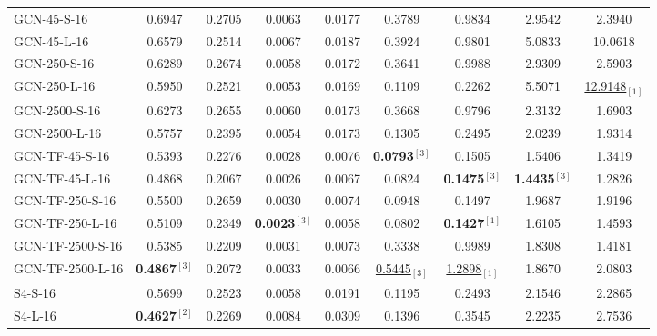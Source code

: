 \begin{table*}[h]
{\begin{tabular}{lcc|cc|cc|cc}
            \midrule
            GCN-45-S-16 
                & 0.6947 & 0.2705
                & 0.0063 & 0.0177 & 0.3789 & 0.9834 & 2.9542 & 2.3940\\
            GCN-45-L-16 
                & 0.6579 & 0.2514
                & 0.0067 & 0.0187 & 0.3924 & 0.9801 & 5.0833 & 10.0618\\
            GCN-250-S-16 
                & 0.6289 & 0.2674
                & 0.0058 & 0.0172 & 0.3641 & 0.9988 & 2.9309 & 2.5903\\
            GCN-250-L-16 
                & 0.5950 & 0.2521
                & 0.0053 & 0.0169 & 0.1109 & 0.2262 & 5.5071 & \underline{12.9148}$_{[1]}$ \\
            GCN-2500-S-16 
                & 0.6273 & 0.2655
                & 0.0060 & 0.0173 & 0.3668 & 0.9796 & 2.3132 & 1.6903\\
            GCN-2500-L-16 
                & 0.5757 & 0.2395
                & 0.0054 & 0.0173 & 0.1305 & 0.2495 & 2.0239 & 1.9314\\
            \midrule
            GCN-TF-45-S-16 
                & 0.5393 & 0.2276
                & 0.0028 & 0.0076 & \textbf{0.0793}$^{[3]}$ & 0.1505 & 1.5406 & 1.3419\\
            GCN-TF-45-L-16 
                & 0.4868 & 0.2067
                & 0.0026 & 0.0067 & 0.0824 & \textbf{0.1475}$^{[3]}$ & \textbf{1.4435}$^{[3]}$ & 1.2826\\
            GCN-TF-250-S-16 
                & 0.5500 & 0.2659
                & 0.0030 & 0.0074 & 0.0948 & 0.1497 & 1.9687 & 1.9196\\
            GCN-TF-250-L-16 
                & 0.5109 & 0.2349
                & \textbf{0.0023}$^{[3]}$ & 0.0058 & 0.0802 & \textbf{0.1427}$^{[1]}$ & 1.6105 & 1.4593\\
            GCN-TF-2500-S-16 
                & 0.5385 & 0.2209
                & 0.0031 & 0.0073 & 0.3338 & 0.9989 & 1.8308 & 1.4181\\
            GCN-TF-2500-L-16 
                & \textbf{0.4867}$^{[3]}$ & 0.2072
                & 0.0033 & 0.0066 & \underline{0.5445}$_{[3]}$ & \underline{1.2898}$_{[1]}$ & 1.8670 & 2.0803\\
            \midrule
            S4-S-16 
                & 0.5699 & 0.2523
                & 0.0058 & 0.0191 & 0.1195 & 0.2493 & 2.1546 & 2.2865\\
            S4-L-16 
                & \textbf{0.4627}$^{[2]}$ & 0.2269
                & 0.0084 & 0.0309 & 0.1396 & 0.3545 & 2.2235 & 2.7536\\

\end{tabular}}
\end{table*}

